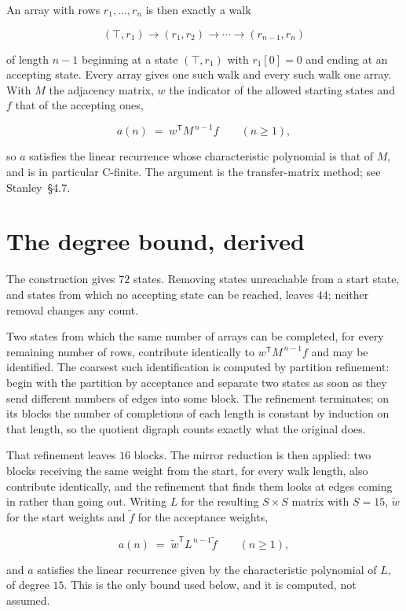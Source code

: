 \documentclass[11pt]{article}
\theoremstyle{definition}
\begin{document}
An array with rows $r_1,\dots,r_n$ is then exactly a walk

\[(\top,r_1) \to (r_1,r_2) \to \cdots \to (r_{n-1},r_n)\]

of length $n-1$ beginning at a state $(\top,r_1)$ with $r_1[0]=0$ and ending at an accepting state. Every array gives one such walk and every such walk one array. With $M$ the adjacency matrix, $w$ the indicator of the allowed starting states and $f$ that of the accepting ones,

\[a(n) \;=\; w^{\mathsf T} M^{\,n-1} f \qquad (n \ge 1),\]

so $a$ satisfies the linear recurrence whose characteristic polynomial is that of $M$, and is in particular C-finite. The argument is the transfer-matrix method; see Stanley~\S4.7.

\section{The degree bound, derived}

The construction gives $72$ states. Removing states unreachable from a start state, and states from which no accepting state can be reached, leaves $44$; neither removal changes any count.

Two states from which the same number of arrays can be completed, for every remaining number of rows, contribute identically to $w^{\mathsf T}M^{\,n-1}f$ and may be identified. The coarsest such identification is computed by partition refinement: begin with the partition by acceptance and separate two states as soon as they send different numbers of edges into some block. The refinement terminates; on its blocks the number of completions of each length is constant by induction on that length, so the quotient digraph counts exactly what the original does.

That refinement leaves $16$ blocks. The mirror reduction is then applied: two blocks receiving the same weight from the start, for every walk length, also contribute identically, and the refinement that finds them looks at edges coming in rather than going out. Writing $L$ for the resulting $S \times S$ matrix with $S = 15$, $\tilde w$ for the start weights and $\tilde f$ for the acceptance weights,

\[a(n) \;=\; \tilde w^{\mathsf T} L^{\,n-1} \tilde f \qquad (n \ge 1),\]

and $a$ satisfies the linear recurrence given by the characteristic polynomial of $L$, of degree $15$. This is the only bound used below, and it is computed, not assumed.
\end{document}
